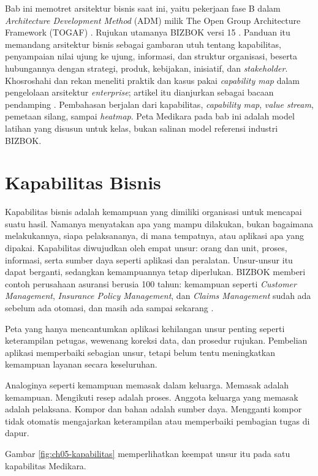 Bab ini memotret arsitektur bisnis saat ini, yaitu pekerjaan fase B dalam
\textit{Architecture Development Method} (ADM) milik The Open Group Architecture
Framework (TOGAF) \cite{togaf10}. Rujukan utamanya BIZBOK versi 15 \cite{bizbok15}.
Panduan itu memandang arsitektur bisnis sebagai gambaran utuh tentang kapabilitas,
penyampaian nilai ujung ke ujung, informasi, dan struktur organisasi, beserta
hubungannya dengan strategi, produk, kebijakan, inisiatif, dan \textit{stakeholder}.
Khosroshahi dan rekan meneliti praktik dan kasus pakai \textit{capability map} dalam
pengelolaan arsitektur \textit{enterprise}; artikel itu dianjurkan sebagai bacaan
pendamping \cite{c05-khosroshahi2018}. Pembahasan berjalan dari kapabilitas,
\textit{capability map}, \textit{value stream}, pemetaan silang, sampai
\textit{heatmap}. Peta Medikara pada bab ini adalah model latihan yang disusun untuk
kelas, bukan salinan model referensi industri BIZBOK.

\section{Kapabilitas Bisnis}

Kapabilitas bisnis adalah kemampuan yang dimiliki organisasi untuk mencapai suatu
hasil. Namanya menyatakan apa yang mampu dilakukan, bukan bagaimana melakukannya,
siapa pelaksananya, di mana tempatnya, atau aplikasi apa yang dipakai. Kapabilitas
diwujudkan oleh empat unsur: orang dan unit, proses, informasi, serta sumber daya
seperti aplikasi dan peralatan. Unsur-unsur itu dapat berganti, sedangkan kemampuannya
tetap diperlukan. BIZBOK memberi contoh perusahaan asuransi berusia 100 tahun:
kemampuan seperti \textit{Customer Management}, \textit{Insurance Policy Management},
dan \textit{Claims Management} sudah ada sebelum ada otomasi, dan masih ada sampai
sekarang \cite{bizbok15}.

Peta yang hanya mencantumkan aplikasi kehilangan unsur penting seperti keterampilan
petugas, wewenang koreksi data, dan prosedur rujukan. Pembelian aplikasi memperbaiki
sebagian unsur, tetapi belum tentu meningkatkan kemampuan layanan secara keseluruhan.

Analoginya seperti kemampuan memasak dalam keluarga. Memasak adalah kemampuan.
Mengikuti resep adalah proses. Anggota keluarga yang memasak adalah pelaksana. Kompor
dan bahan adalah sumber daya. Mengganti kompor tidak otomatis mengajarkan keterampilan
atau memperbaiki pembagian tugas di dapur.

Gambar \ref{fig:ch05-kapabilitas} memperlihatkan keempat unsur itu pada satu
kapabilitas Medikara.

